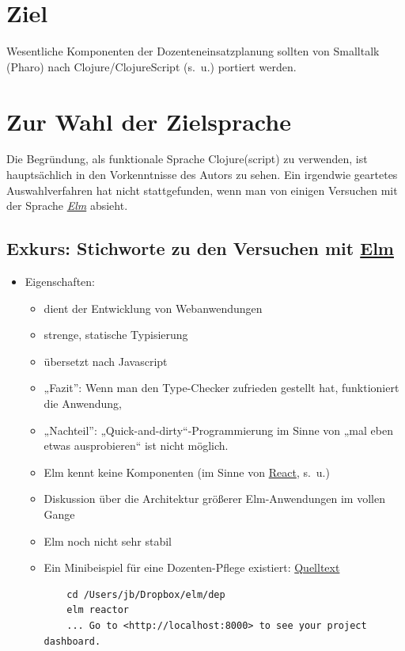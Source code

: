 \documentclass[11pt]{article}
\begin{document}
\section*{Ziel}
\label{sec:org413ab4c}
Wesentliche Komponenten der Dozenteneinsatzplanung sollten von
Smalltalk (Pharo) nach Clojure/ClojureScript (s.~u.) portiert werden.
\section*{Zur Wahl der Zielsprache}
\label{sec:org849b6e5}
Die Begründung, als funktionale Sprache Clojure(script) zu verwenden,
ist hauptsächlich in den Vorkenntnisse des Autors zu sehen. Ein
irgendwie geartetes Auswahlverfahren hat nicht stattgefunden, wenn man
von einigen Versuchen mit der Sprache \emph{\href{https://elm-lang.org}{Elm}} absieht.
\subsection*{Exkurs: Stichworte zu den Versuchen mit \href{https://elm-lang.org}{Elm}}
\label{sec:org8d95680}
\begin{itemize}
\item Eigenschaften:
\begin{itemize}
\item dient der Entwicklung von Webanwendungen
\item strenge, statische Typisierung
\item übersetzt nach Javascript
\item „Fazit”: Wenn man den Type-Checker zufrieden gestellt hat,
funktioniert die Anwendung,
\item „Nachteil”: „Quick-and-dirty“-Programmierung im Sinne von „mal eben
etwas ausprobieren“ ist nicht möglich.
\item Elm kennt keine Komponenten (im Sinne von \href{https://reactjs.org}{React}, s.~u.)
\item Diskussion über die Architektur größerer Elm-Anwendungen im vollen Gange
\item Elm noch nicht sehr stabil
\item Ein Minibeispiel für eine Dozenten-Pflege existiert: \href{./Dozent-V0.elm}{Quelltext}
\begin{verbatim}
    cd /Users/jb/Dropbox/elm/dep 
    elm reactor
    ... Go to <http://localhost:8000> to see your project dashboard.
\end{verbatim}
\end{itemize}
\end{itemize}
\end{document}

